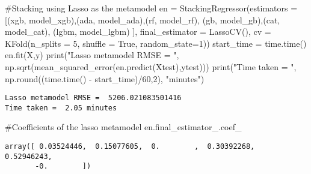 \documentclass[
  letterpaper,
  DIV=11,
  numbers=noendperiod]{scrreprt}
\newenvironment{Shaded}{\begin{snugshade}}{\end{snugshade}}
\newcommand{\BuiltInTok}[1]{\textcolor[rgb]{0.00,0.23,0.31}{#1}}
\newcommand{\CommentTok}[1]{\textcolor[rgb]{0.37,0.37,0.37}{#1}}
\newcommand{\DecValTok}[1]{\textcolor[rgb]{0.68,0.00,0.00}{#1}}
\newcommand{\NormalTok}[1]{\textcolor[rgb]{0.00,0.23,0.31}{#1}}
\newcommand{\OperatorTok}[1]{\textcolor[rgb]{0.37,0.37,0.37}{#1}}
\newcommand{\StringTok}[1]{\textcolor[rgb]{0.13,0.47,0.30}{#1}}
\newcommand{\VariableTok}[1]{\textcolor[rgb]{0.07,0.07,0.07}{#1}}
\begin{document}
\begin{Shaded}
\begin{Highlighting}[]
\CommentTok{\#Stacking using Lasso as the metamodel}
\NormalTok{en }\OperatorTok{=}\NormalTok{ StackingRegressor(estimators }\OperatorTok{=}\NormalTok{ [(}\StringTok{\textquotesingle{}xgb\textquotesingle{}}\NormalTok{, model\_xgb),(}\StringTok{\textquotesingle{}ada\textquotesingle{}}\NormalTok{, model\_ada),(}\StringTok{\textquotesingle{}rf\textquotesingle{}}\NormalTok{, model\_rf),}
\NormalTok{                        (}\StringTok{\textquotesingle{}gb\textquotesingle{}}\NormalTok{, model\_gb),(}\StringTok{\textquotesingle{}cat\textquotesingle{}}\NormalTok{, model\_cat), (}\StringTok{\textquotesingle{}lgbm\textquotesingle{}}\NormalTok{, model\_lgbm) ],}
\NormalTok{                     final\_estimator }\OperatorTok{=}\NormalTok{ LassoCV(),                                          }
\NormalTok{                    cv }\OperatorTok{=}\NormalTok{ KFold(n\_splits }\OperatorTok{=} \DecValTok{5}\NormalTok{, shuffle }\OperatorTok{=} \VariableTok{True}\NormalTok{, random\_state}\OperatorTok{=}\DecValTok{1}\NormalTok{))}
\NormalTok{start\_time }\OperatorTok{=}\NormalTok{ time.time()}
\NormalTok{en.fit(X,y)}
\BuiltInTok{print}\NormalTok{(}\StringTok{"Lasso metamodel RMSE = "}\NormalTok{, np.sqrt(mean\_squared\_error(en.predict(Xtest),ytest)))}
\BuiltInTok{print}\NormalTok{(}\StringTok{"Time taken = "}\NormalTok{, np.}\BuiltInTok{round}\NormalTok{((time.time() }\OperatorTok{{-}}\NormalTok{ start\_time)}\OperatorTok{/}\DecValTok{60}\NormalTok{,}\DecValTok{2}\NormalTok{), }\StringTok{"minutes"}\NormalTok{)}
\end{Highlighting}
\end{Shaded}

\begin{verbatim}
Lasso metamodel RMSE =  5206.021083501416
Time taken =  2.05 minutes
\end{verbatim}

\begin{Shaded}
\begin{Highlighting}[]
\CommentTok{\#Coefficients of the lasso metamodel}
\NormalTok{en.final\_estimator\_.coef\_}
\end{Highlighting}
\end{Shaded}

\begin{verbatim}
array([ 0.03524446,  0.15077605,  0.        ,  0.30392268,  0.52946243,
       -0.        ])
\end{verbatim}
\end{document}
